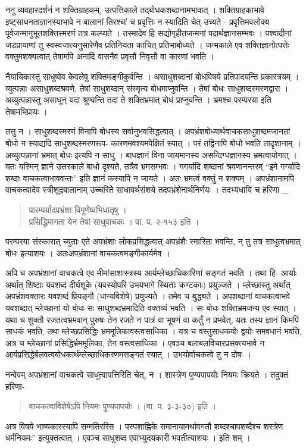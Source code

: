 ननु व्यवहारदर्शनं न शक्तिग्राहकम्, उत्पत्तिकाले तद्बोधकशब्दानामभावात् । शक्तिग्राहकाभावे इष्ट्साधनताज्ञानस्याभावे न बालानां तिरश्चां च प्रवृत्तिः न स्यादिति चेत् उच्यते - प्रवृत्तिमवलोक्य पूर्वजन्मानुभूतशक्तिस्मरणं तत्र कल्प्यते । तस्मादेव हि सद्योगृहीतजन्मनां पदार्थज्ञानसम्भवः । पश्वादीनां जडप्रायाणां तु स्वस्वजात्यनुसारेणैव प्रतिनियता काचित् प्रतिभाबोध्यते । जन्मकाले एव शक्तिज्ञानोत्पत्तेः वक्तुमशक्यत्वात् तेषामपि अनादि वासनैव प्रवृत्तौ निवृत्तौ वा कारणां भवति । 

नैयायिकास्तु साधुष्वेव केवलेषु शक्तिमङ्गीकुर्वन्ति । असाधुशब्दानां बोधविषये प्रतिपादयन्ति प्रकारत्रयम् । व्युत्पन्नाः असाधुशब्दश्रवणे, तेषां साधुशब्दान् संस्मृत्य बोधमाप्नुवन्ति । तेषां बोधः साधुशब्दस्मरणद्वारा । अव्युत्पन्नास्तु असाधून् यदा श्रुण्वन्ति तदा ते शक्तिभ्रमात् बोधं प्राप्नुवन्ति । भ्रमश्च परम्परया इति तेषामभिप्रायः ।

तत्तु न । साधुशब्दस्मरणं विनापि बोधस्य सर्वानुभवसिद्धत्वात् । अपभ्रंशबोध्यार्थवाचकसाधुशब्दमजानतां बोधो न स्याद्यदि साधुशब्दस्मरणरूप- कारणमवश्यमपेक्षितं स्यात् । परं तद्विनापि बोधो भवति तादृशानाम् । अव्युत्पन्नानां भ्रमात् बोधः इत्यपि न साधु । बाधज्ञानं विना जायमानस्य असन्दिग्धज्ञानस्य भ्रमत्वायोगात् । यतः यस्मिन् ज्ञाने उत्तरकाले बाधो दृश्यते, तत्रैव भ्रमसम्भवः । गगर्यादि शब्दानां श्रवणानन्तरम् “इमे गर्ग्यादि शब्दाः वाचकत्वाभाववन्तः” इति ज्ञानं कस्यापि न जायते । अतः भ्रमत्वं वक्तुं न शक्यम् । अपभ्रंशानामपि वाचकत्वादेव स्त्रीशूद्रबालानाम् उच्चरिते साधावर्थसंशये तदपभ्रंशेनार्थनिर्णयः । तदभ्यधायि च हरिणा _
\begin{verse}
पारम्पर्यादपभ्रंशा विगुणेष्वभिधातृषु । \\
प्रसिद्धिमागता येन तेषां साधुवाचकः ॥ वा. प. २-१५३ इति ।
\end{verse}
परम्परया संस्कारात् च्युताः एते अपभ्रंशाः लोकप्रसिद्धत्वात्  अपभ्रंशैः स्मारिता भवन्ति, न् तु तत्र साधुत्वभ्रमात् बोधः इत्याशयः । अतःअपभ्रंशानां वाचकत्वमङ्गीकार्यमेव ।

अपि च अपभ्रंशानां वाचकत्वे एव मीमांसाशास्त्रस्य आर्यम्लेच्छाधिकारिणां सङ्गतं भवति । तथा हि- आर्याः अर्थात् शिष्टाः यवशब्दं दीर्घशूके (यवस्योपरि उभयभागे स्थिताः कण्टकाः) प्रयुञ्जते । म्लेच्छास्तु अर्थात् अपभ्रंशवक्तारः यवशब्दं प्रियङ्गौ (धान्यविशेषे) प्रयुज्यते । तमेव च बुद्ध्यते । अपशब्दानां वाचकत्वाभवे यवशब्दात् म्लेच्छानां यो बोधः सः साधुशब्दभ्रमादिति वक्तव्यं भवति । सः बोधः शक्तिभ्रमजन्य एव स्यात् । यथा च शुक्तौ रजतत्वभ्रमवान् पुरुषः तेन रजते न पात्रं वा भूषणं वा कर्तुं न प्रभवेत्, यतः तस्य ज्ञानं किमपि साधकं भवति, तथा म्लेच्छप्रसिद्धिः भ्रममूलिकावस्त्वसाधिका । यत्र च वस्तुसाधकयोः द्वयोः समवधानं भवति, अत्र च म्लेच्छानां प्रसिद्धिर्भ्रममूलिका, तेन वस्त्वसाधिका । एवञ्च बलाबलविचारप्रसक्त्यभावे न आर्यप्रसिद्धेर्बलवत्वबोधकार्थम्लेच्छाधिकरणमसङ्गतं स्यात् । उभयोर्वाचकत्वे तु न दोषः ।

नन्वेवम् अपभ्रंशानां वाचकत्वे साधुत्वापत्तिरिति चेत्, न । शास्त्रेण पुण्यपापयोः नियमः क्रियते । तदुक्तं हरिणा-
\begin{verse}
वाचकत्वाविशेषेऽपि नियमः पुण्यपापयोः । (वा. प. ३-३-३०) इति । 
\end{verse}
अत्र विषये भाष्यकारस्यापि सम्मतिरस्ति । पस्पशाह्निके समानायामर्थावगतौ शब्दश्चापशब्दैश्च शस्त्रेण धर्मनियमः” इत्युक्तत्वात् । एवञ्च साधुशब्द एवाभ्युदयकारी भवतीत्याशयः । इति शम् ।
